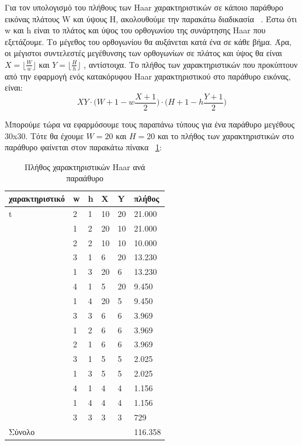 Για τον υπολογισμό του πλήθους των Haar χαρακτηριστικών σε κάποιο παράθυρο εικόνας
πλάτους W και ύψους H, ακολουθούμε την παρακάτω διαδικασία ~\cite{Lienhart02anextended}. Έστω ότι w και h
είναι το πλάτος και ύψος του ορθογωνίου της συνάρτησης Haar που εξετάζουμε. Το μέγεθος του
ορθογωνίου θα αυξάνεται κατά ένα σε κάθε βήμα. Άρα, οι μέγιστοι συντελεστές μεγέθυνσης των
ορθογωνίων σε πλάτος και ύψος θα είναι $X = \lfloor \frac{W}{w} \rfloor $ και $Y = \lfloor \frac{H}{h} \rfloor$ , αντίστοιχα. Το πλήθος των
χαρακτηριστικών που προκύπτουν από την εφαρμογή ενός κατακόρυφου Haar χαρακτηριστικού
στο παράθυρο εικόνας, είναι:
$$
XY \cdot \Bigg(W+1-w \frac{X+1}{2} \Bigg) \cdot \Bigg(H+1-h \frac{Y+1}{2} \Bigg)
$$

Μπορούμε τώρα να εφαρμόσουμε τους παραπάνω τύπους για ένα παράθυρο μεγέθους 30x30.
Τότε θα έχουμε $W=20$ και $Η=20$ και το πλήθος των χαρακτηριστικών στο παράθυρο φαίνεται
στον παρακάτω πίνακα ~\ref{tab:haarsum}:


\begin{table}[htbp]
  \centering
    \begin{tabular}{ | l | l | l | l | l | l | }
    \hline
        χαρακτηριστικό  & w & h  & X  & Y & πλήθος \\ \hline
    \hline
        t  & 2 & 1 & 10 & 20 & 21.000 \\
    \hline
        & 1 & 2 & 20 & 10 & 21.000 \\
    \hline
        & 2 & 2 & 10 & 10  & 10.000\\
    \hline
        & 3 & 1 & 6 & 20 & 13.230 \\
    \hline
        & 1 & 3 & 20 & 6 & 13.230 \\
    \hline
        & 4 & 1 & 5 & 20 & 9.450\\
    \hline
        & 1 & 4 & 20 & 5 & 9.450\\
    \hline
        & 3 & 3 & 6 & 6 & 3.969 \\
    \hline
        & 1 & 2 & 6 & 6 & 3.969\\
    \hline
        & 2 & 1 & 6 & 6 & 3.969\\
    \hline
        & 3 & 1 & 5 & 5 & 2.025 \\
    \hline
        & 1 & 3 & 5 & 5 & 2.025 \\
    \hline
        & 4 & 1 & 4 & 4 & 1.156 \\
    \hline
        & 1 & 4 & 4 & 4 & 1.156 \\
    \hline
        & 3 & 3 & 3 & 3 & 729 \\
    \hline
        Σύνολο & & & & &116.358 \\
    \hline
  \end{tabular}
  \caption{Πλήθος χαρακτηριστικών Haar ανά παραάθυρο}
  \label{tab:haarsum}
\end{table}

